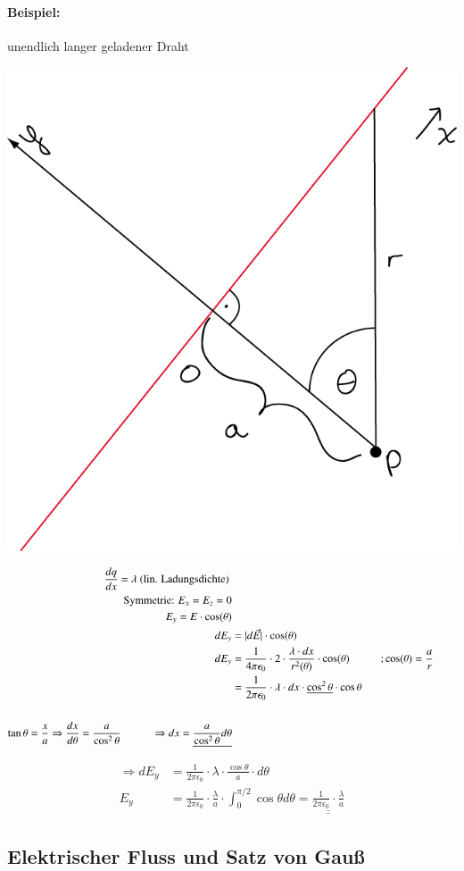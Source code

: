 \documentclass[11pt]{article}
\begin{document}
		\paragraph{Beispiel:} unendlich langer geladener Draht \\
		\begin{center}
			\includegraphics[width=0.5\linewidth]{skizzen/14/14_5B1}
		\end{center}
		\begin{align*}
		\frac{dq}{dx} = \lambda \text{ (lin. Ladungsdichte) } \\
		\text{Symmetrie: } E_x = E_z = 0 \\
		E_y = E \cdot \cos(\theta) \\
		dE_y& = | d\vec{E} | \cdot \cos (\theta) \\
		dE_y &= \frac{1}{4\pi\epsilon_0} \cdot 2 \cdot \frac{\lambda \cdot dx}{r^2 (\theta)} \cdot \cos (\theta) \hspace{1cm} ; \cos (\theta) = \frac{a}{r}&& \\
		&= \frac{1}{2\pi\epsilon_0} \cdot \lambda \cdot dx  \cdot \underline{\cos^2\theta} \cdot \cos\theta \\
		\hfill \\
		\tan\theta = \frac{x}{a} \Rightarrow \frac{dx}{d\theta} = \frac{a}{\cos^2\theta} \hspace{1cm} \Rightarrow dx = \underline{\frac{a}{\cos^2\theta} d\theta}
		\end{align*}
		
		\begin{align*}
		\Rightarrow dE_y &= \frac{1}{2\pi\epsilon_0} \cdot \lambda \cdot \frac{\cos\theta}{a} \cdot d\theta \\
		E_y &= \frac{1}{2\pi\epsilon_0} \cdot \frac{\lambda}{a} \cdot { \displaystyle\int_{0}^{\pi/2} \cos\theta d\theta } = \underline{\underline{\frac{1}{2\pi\epsilon_0} \cdot  \frac{\lambda}{a} }}
		\end{align*}

		
	
\subsection{Elektrischer Fluss und Satz von Gauß}
	
	
\end{document}
